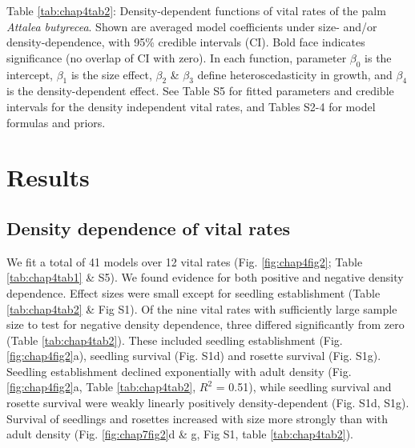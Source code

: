 \documentclass[b5paper,justified]{tufte-book} %
\begin{document}
\begin{fullwidth}
\begin{landscape}
\begin{table}
\begin{center}
\hspace*{4cm}\begin{minipage}{20.5cm}
\vspace{0.3cm}
Table \ref{tab:chap4tab2}: Density-dependent functions of vital rates of the palm \textit{Attalea butyrecea}. Shown are averaged model coefficients under size- and/or density-dependence, with 95\% credible intervals (CI). Bold face indicates significance (no overlap of CI with zero). In each function, parameter $\beta_0$ is the intercept, $\beta_1$ is the size effect, $\beta_2$ \& $\beta_3$ define heteroscedasticity in growth, and $\beta_4$ is the density-dependent effect.  See Table S5 for fitted parameters and credible intervals for the density independent vital rates, and Tables S2-4 for model formulas and priors. \end{minipage} 
\label{tab:chap4tab2}
\end{center}
\end{table}
\end{landscape}

\section{Results}

\subsection{Density dependence of vital rates}
We fit a total of 41 models over 12 vital rates (Fig. \ref{fig:chap4fig2};  Table \ref{tab:chap4tab1} \& S5). We found evidence for both positive and negative density dependence. Effect sizes were small except for seedling establishment (Table \ref{tab:chap4tab2} \& Fig S1). Of the nine vital rates with sufficiently large sample size to test for negative density dependence, three differed significantly from zero (Table \ref{tab:chap4tab2}).  These included seedling establishment (Fig. \ref{fig:chap4fig2}a), seedling survival (Fig. S1d) and rosette survival (Fig. S1g).  Seedling establishment declined exponentially with adult density (Fig. \ref{fig:chap4fig2}a, Table \ref{tab:chap4tab2}, $R^2$ = 0.51), while seedling survival and rosette survival were weakly linearly positively density-dependent (Fig. S1d, S1g).  Survival of seedlings and rosettes increased with size more strongly than with adult density (Fig. \ref{fig:chap7fig2}d \& g, Fig S1, table \ref{tab:chap4tab2}). 


\end{fullwidth}
\end{document}
